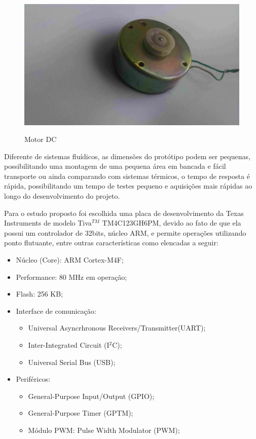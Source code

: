 \begin{figure}[!htb]
\caption{Motor DC}
\center\includegraphics[scale=0.1, angle=0, clip=true, trim=1500 500 400 200]
{./imagens/motorDC.jpg}
\label{fig:motor DC}
\end{figure}

Diferente de sistemas fluídicos, as dimensões do protótipo podem ser pequenas, possibilitando uma montagem de uma pequena área em bancada e fácil transporte ou ainda comparando com sistemas térmicos, o tempo de resposta é rápida, possibilitando um tempo de testes pequeno e aquisições mais rápidas ao longo do desenvolvimento do projeto.






Para o estudo proposto foi escolhida uma placa de desenvolvimento da Texas Instruments de modelo Tiva$^{TM}$ TM4C123GH6PM, devido ao fato de que ela possui um controlador de 32bits, núcleo ARM, e permite operações utilizando ponto flutuante, entre outras características como elencadas a seguir:

\begin{itemize}
\item Núcleo (Core): ARM Cortex-M4F;
\item Performance: 80 MHz em operação;
\item Flash: 256 KB;
\item Interface de comunicação:
	\begin{itemize}
	\item  Universal Asyncrhronous Receivers/Transmitter(UART);
  	\item Inter-Integrated Circuit (I$^2$C);
	\item Universal Serial Bus (USB);
	\end{itemize}
\item Periféricos:
	\begin{itemize}
	\item General-Purpose Input/Output (GPIO);
	\item General-Purpose Timer (GPTM);
	\item Módulo PWM: Pulse Width Modulator (PWM);
	\end{itemize}
\end{itemize}

